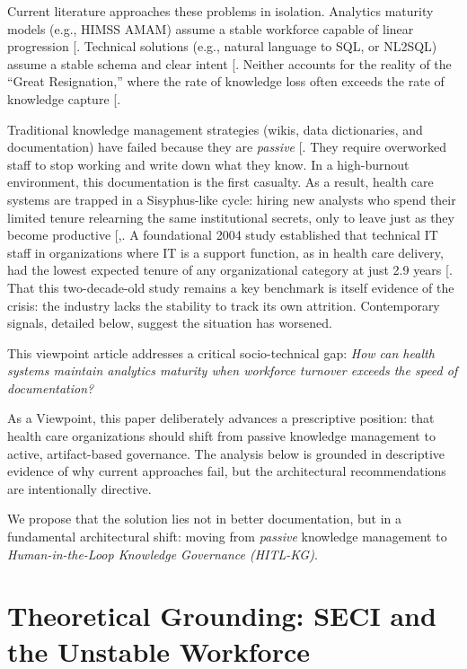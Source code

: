 \documentclass[
  american,
  11pt,
  letterpaper,
  oneside  ,captions=tableheading
]{scrartcl}
\begin{document}
Current literature approaches these problems in isolation. Analytics
maturity models (e.g., HIMSS AMAM) assume a stable workforce capable of
linear progression {[}\citeproc{ref-himss2024}{1}{]}. Technical
solutions (e.g., natural language to SQL, or NL2SQL) assume a stable
schema and clear intent {[}\citeproc{ref-wang2020}{15}{]}. Neither
accounts for the reality of the ``Great Resignation,'' where the rate of
knowledge loss often exceeds the rate of knowledge capture
{[}\citeproc{ref-rao2006}{13}{]}.

Traditional knowledge management strategies (wikis, data dictionaries,
and documentation) have failed because they are \emph{passive}
{[}\citeproc{ref-mayo2016}{16}{]}. They require overworked staff to stop
working and write down what they know. In a high-burnout environment,
this documentation is the first casualty. As a result, health care
systems are trapped in a Sisyphus-like cycle: hiring new analysts who
spend their limited tenure relearning the same institutional secrets,
only to leave just as they become productive
{[},\citeproc{ref-mantas2010}{18}{]}. A
foundational 2004 study established that technical IT staff in
organizations where IT is a support function, as in health care
delivery, had the lowest expected tenure of any organizational category
at just 2.9 years {[}\citeproc{ref-ang2004}{19}{]}. That this
two-decade-old study remains a key benchmark is itself evidence of the
crisis: the industry lacks the stability to track its own attrition.
Contemporary signals, detailed below, suggest the situation has
worsened.

This viewpoint article addresses a critical socio-technical gap:
\emph{How can health systems maintain analytics maturity when workforce
turnover exceeds the speed of documentation?}

As a Viewpoint, this paper deliberately advances a prescriptive
position: that health care organizations should shift from passive
knowledge management to active, artifact-based governance. The analysis
below is grounded in descriptive evidence of why current approaches
fail, but the architectural recommendations are intentionally directive.

We propose that the solution lies not in better documentation, but in a
fundamental architectural shift: moving from \emph{passive} knowledge
management to \emph{Human-in-the-Loop Knowledge Governance (HITL-KG)}.

\section{Theoretical Grounding: SECI and the Unstable
Workforce}\label{theoretical-grounding-seci-and-the-unstable-workforce}
\end{document}
